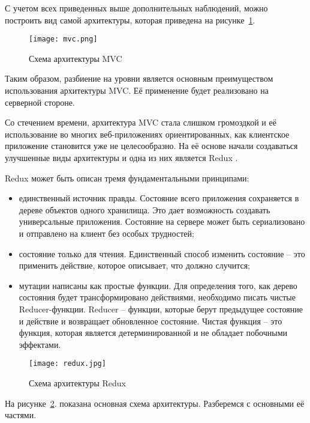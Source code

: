 С учетом всех приведенных выше дополнительных наблюдений, можно построить вид самой архитектуры, которая приведена на рисунке~\ref{fig:domain:manual_structure:credit_net}.

\begin{figure}[ht]
\centering
  \texttt{[image: mvc.png]}  
  \caption{ 
  Схема архитектуры MVC }
  \label{fig:domain:manual_structure:credit_net}
\end{figure}

Таким образом, разбиение на уровни является основным преимуществом использования архитектуры MVC. Её применение будет реализовано на серверной стороне.

Со стечением времени, архитектура MVC стала слишком громоздкой и её использование во многих веб-приложениях ориентированных, как клиентское приложение становится уже не целесообразно. На её основе начали создаваться улучшенные виды архитектуры и одна из них является Redux \cite{redux}.

Redux может быть описан тремя фундаментальными принципами:
 
\begin{itemize}
  \item единственный источник правды. Состояние всего приложения сохраняется в дереве объектов одного хранилища. Это дает возможность создавать универсальные приложения. Состояние на сервере может быть сериализовано и отправлено на клиент без особых трудностей;
  \item состояние только для чтения. Единственный способ изменить состояние -- это применить действие, которое описывает, что должно случится;
  \item мутации написаны как простые функции. Для определения того, как дерево состояния будет трансформировано действиями, необходимо писать чистые Reducer-функции. Reducer -- функции, которые берут предыдущее состояние и действие и возвращает обновленное состояние. Чистая функция -- это функция, которая является детерминированной и не обладает побочными эффектами.
\end{itemize}

\begin{figure}[ht]
\centering
  \texttt{[image: redux.jpg]}  
  \caption{ Схема архитектуры Redux }
  \label{fig:domain:manual_structure:credit_redux}
\end{figure}

На рисунке~\ref{fig:domain:manual_structure:credit_redux}. показана основная схема архитектуры. Разберемся с основными её частями.


